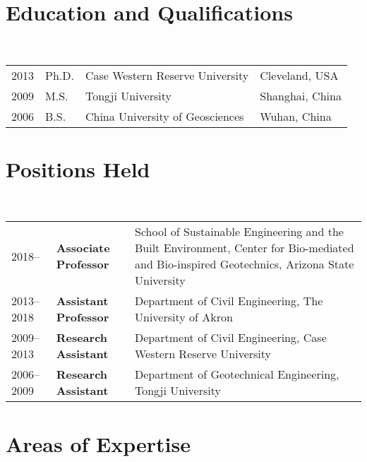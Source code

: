 \documentclass[letterpaper, 12pt]{extarticle}
\begin{document}
\maketitle

\section{Education and Qualifications}

~\begin{tabular}{llll}
	2013 & Ph.D. & Case Western Reserve University & Cleveland, USA  \\
	2009 & M.S.  & Tongji University               & Shanghai, China \\
	2006 & B.S.  & China University of Geosciences & Wuhan, China
\end{tabular}


\section{Positions Held}

~\begin{tabular}{lP{3.5cm}P{11cm}}
	2018--     & \textbf{Associate Professor} &
	School of Sustainable Engineering and the Built Environment,
	\newline
	Center for Bio-mediated and Bio-inspired Geotechnics,
	\newline
	Arizona State University                    \\
	2013--2018 & \textbf{Assistant Professor} &
	Department of Civil Engineering,
	\newline
	The University of Akron                     \\
	2009--2013 & \textbf{Research Assistant}  &
	Department of Civil Engineering,
	\newline
	Case Western Reserve University             \\
	2006--2009 & \textbf{Research Assistant}  &
	Department of Geotechnical Engineering,
	\newline
	Tongji University
\end{tabular}

\section{Areas of Expertise}%
\end{document}
